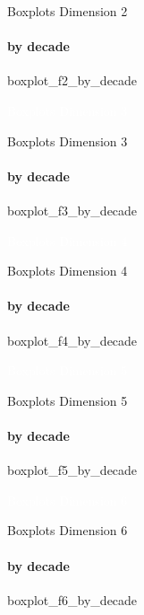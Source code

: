 {\nologo
\begin{frame}{Boxplots Dimension 2}
    \framesubtitle{by decade}
    {boxplot_f2_by_decade}
\end{frame}
}

{\nologo
{}
\begin{frame}[c,plain]{}
    \vspace*{1cm}
    \centering
    \Huge
    \textcolor{white}{Boxplots Dimension 3}
\end{frame}
}

{\nologo
\begin{frame}{Boxplots Dimension 3}
    \framesubtitle{by decade}
    {boxplot_f3_by_decade}
\end{frame}
}

{\nologo
{}
\begin{frame}[c,plain]{}
    \vspace*{1cm}
    \centering
    \Huge
    \textcolor{white}{Boxplots Dimension 4}
\end{frame}
}

{\nologo
\begin{frame}{Boxplots Dimension 4}
    \framesubtitle{by decade}
    {boxplot_f4_by_decade}
\end{frame}
}

{\nologo
{}
\begin{frame}[c,plain]{}
    \vspace*{1cm}
    \centering
    \Huge
    \textcolor{white}{Boxplots Dimension 5}
\end{frame}
}

{\nologo
\begin{frame}{Boxplots Dimension 5}
    \framesubtitle{by decade}
    {boxplot_f5_by_decade}
\end{frame}
}

{\nologo
{}
\begin{frame}[c,plain]{}
    \vspace*{1cm}
    \centering
    \Huge
    \textcolor{white}{Boxplots Dimension 6}
\end{frame}
}

{\nologo
\begin{frame}{Boxplots Dimension 6}
    \framesubtitle{by decade}
    {boxplot_f6_by_decade}
\end{frame}
}

